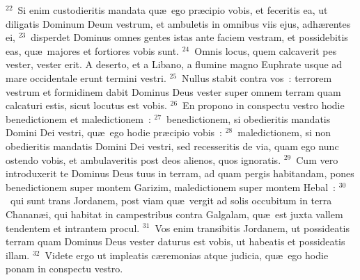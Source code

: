 ${}^{22}$~Si enim custodieritis mandata qu\ae\ ego pr\ae cipio vobis, et feceritis ea, ut diligatis Dominum Deum vestrum, et ambuletis in omnibus viis ejus, adh\ae rentes ei,
${}^{23}$~disperdet Dominus omnes gentes istas ante faciem vestram, et possidebitis eas, qu\ae\ majores et fortiores vobis sunt.
${}^{24}$~Omnis locus, quem calcaverit pes vester, vester erit. A deserto, et a Libano, a flumine magno Euphrate usque ad mare occidentale erunt termini vestri.
${}^{25}$~Nullus stabit contra vos~: terrorem vestrum et formidinem dabit Dominus Deus vester super omnem terram quam calcaturi estis, sicut locutus est vobis.
${}^{26}$~En propono in conspectu vestro hodie benedictionem et maledictionem~:
${}^{27}$~benedictionem, si obedieritis mandatis Domini Dei vestri, qu\ae\ ego hodie pr\ae cipio vobis~:
${}^{28}$~maledictionem, si non obedieritis mandatis Domini Dei vestri, sed recesseritis de via, quam ego nunc ostendo vobis, et ambulaveritis post deos alienos, quos ignoratis.
${}^{29}$~Cum vero introduxerit te Dominus Deus tuus in terram, ad quam pergis habitandam, pones benedictionem super montem Garizim, maledictionem super montem Hebal~:
${}^{30}$~qui sunt trans Jordanem, post viam qu\ae\ vergit ad solis occubitum in terra Chanan\ae i, qui habitat in campestribus contra Galgalam, qu\ae\ est juxta vallem tendentem et intrantem procul.
${}^{31}$~Vos enim transibitis Jordanem, ut possideatis terram quam Dominus Deus vester daturus est vobis, ut habeatis et possideatis illam.
${}^{32}$~Videte ergo ut impleatis c\ae remonias atque judicia, qu\ae\ ego hodie ponam in conspectu vestro.

